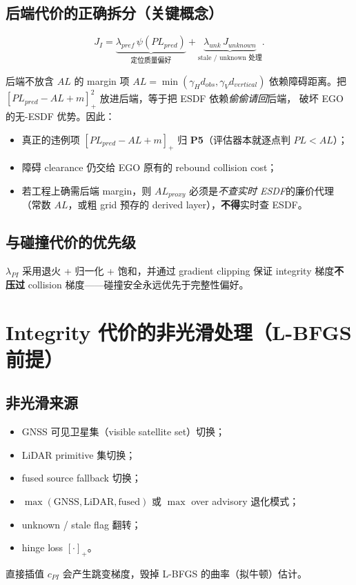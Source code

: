 \documentclass[11pt]{ctexart}
\begin{document}
\subsection{后端代价的正确拆分（关键概念）}
\begin{equation}
J_I=\underbrace{\lambda_{pref}\,\psi(PL_{pred})}_{\text{定位质量偏好}}
   +\underbrace{\lambda_{unk}\,J_{unknown}}_{\text{stale / unknown 处理}} .
\end{equation}

\begin{warnbox}{后端不放含 $AL$ 的 margin 项}
$AL=\min(\gamma_H d_{obs},\gamma_V d_{vertical})$ 依赖障碍距离。把
$[PL_{pred}-AL+m]_+^2$ 放进后端，等于把 ESDF 依赖\emph{偷偷请回}后端，
破坏 EGO 的无-ESDF 优势。因此：
\begin{itemize}
\item 真正的违例项 $[PL_{pred}-AL+m]_+$ 归 \textbf{P5}（评估器本就逐点判 $PL<AL$）；
\item 障碍 clearance 仍交给 EGO 原有的 rebound collision cost；
\item 若工程上确需后端 margin，则 $AL_{proxy}$ 必须是\emph{不查实时 ESDF}的廉价代理
  （常数 $AL$，或粗 grid 预存的 derived layer），\textbf{不得}实时查 ESDF。
\end{itemize}
\end{warnbox}

\subsection{与碰撞代价的优先级}
$\lambda_{PI}$ 采用退火 + 归一化 + 饱和，并通过 gradient clipping 保证
integrity 梯度\textbf{不压过} collision 梯度——碰撞安全永远优先于完整性偏好。

\section{Integrity 代价的非光滑处理（L-BFGS 前提）}

\subsection{非光滑来源}
\begin{itemize}
\item GNSS 可见卫星集（visible satellite set）切换；
\item LiDAR primitive 集切换；
\item fused source fallback 切换；
\item $\max(\text{GNSS},\text{LiDAR},\text{fused})$ 或 $\max$ over advisory 退化模式；
\item unknown / stale flag 翻转；
\item hinge loss $[\cdot]_+$。
\end{itemize}
直接插值 $c_{PI}$ 会产生跳变梯度，毁掉 L-BFGS 的曲率（拟牛顿）估计。
\end{document}
